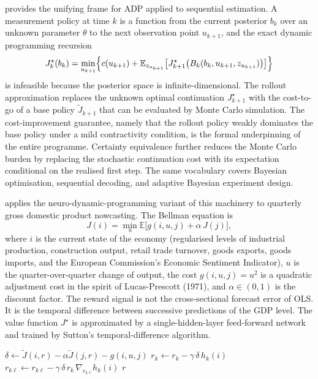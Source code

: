 \citet{BertsekasRollout2022} provides the unifying frame for ADP applied
to sequential estimation. A measurement policy at time $k$ is a function
from the current posterior $b_k$ over an unknown parameter $\theta$ to
the next observation point $u_{k+1}$, and the exact dynamic programming
recursion
\begin{equation}
J^\star_k(b_k) = \min_{u_{k+1}}\Bigl\{
  c(u_{k+1}) + \mathbb E_{z_{u_{k+1}}}\bigl[
    J^\star_{k+1}\bigl(B_k(b_k, u_{k+1}, z_{u_{k+1}})\bigr)
  \bigr] \Bigr\}
\label{eq:bertsekas_dp}
\end{equation}
is infeasible because the posterior space is infinite-dimensional. The
rollout approximation replaces the unknown optimal continuation
$J^\star_{k+1}$ with the cost-to-go of a base policy
$\widetilde J_{k+1}$ that can be evaluated by Monte Carlo simulation. The
cost-improvement guarantee, namely that the rollout policy weakly
dominates the base policy under a mild contractivity condition, is the
formal underpinning of the entire programme. Certainty equivalence
further reduces the Monte Carlo burden by replacing the stochastic
continuation cost with its expectation conditional on the realised first
step. The same vocabulary covers Bayesian optimisation, sequential decoding,
and adaptive Bayesian experiment design.

\citet{Fernandes2024} applies the neuro-dynamic-programming variant of this
machinery to quarterly gross domestic product nowcasting. The Bellman
equation is
\begin{equation}
J(i) = \min_u \mathbb E\bigl[ g(i, u, j) + \alpha\, J(j) \bigr],
\label{eq:fernandes_bellman}
\end{equation}
where $i$ is the current state of the economy (regularised levels of
industrial production, construction output, retail trade turnover, goods
exports, goods imports, and the European Commission's Economic Sentiment
Indicator), $u$ is the quarter-over-quarter change of output, the cost
$g(i, u, j) = u^2$ is a quadratic adjustment cost in the spirit of
Lucas-Prescott (1971), and $\alpha \in (0, 1)$ is the discount factor. The
reward signal is not the cross-sectional forecast error of OLS. It is the
temporal difference between successive predictions of the GDP level. The
value function $J^\star$ is approximated by a single-hidden-layer
feed-forward network and trained by Sutton's temporal-difference algorithm.

\begin{algorithm}[h]
\caption{TD(0) with neural cost-to-go approximation \citep{Fernandes2024}}
\label{alg:fernandes_td0}
\begin{algorithmic}[1]
\State $\delta \gets \widetilde J(i, r) - \alpha \widetilde J(j, r) - g(i, u, j)$
\State $r_k \gets r_k - \gamma\, \delta\, h_k(i)$
\State $r_{k\ell} \gets r_{k\ell} - \gamma\, \delta\, r_k\,
  \nabla_{r_{k\ell}} h_k(i)$
\State \Return $r$
\end{algorithmic}
\end{algorithm}

